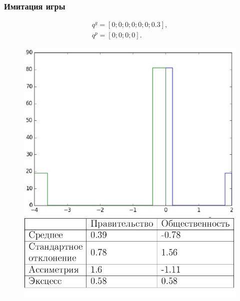\documentclass {beamer}
\begin{document}
\begin{frame}
	\frametitle{Имитация игры}
 \begin{gather*}
 q^g = \left[ 0; 0; 0; 0; 0; 0; 0.3 \right], \\
 q^p = \left[ 0; 0; 0; 0 \right].
 \end{gather*}
 
\begin{figure}
	\begin{minipage}[b]{0.45\textwidth}
		
		\includegraphics[width=\textwidth]{forth}
	\end{minipage}
	\begin{minipage}[b]{0.45\textwidth}
		
		\includegraphics[width=\textwidth]{fifth}
	\end{minipage}
	
\end{figure}
	
\end{frame}
\end{document}
